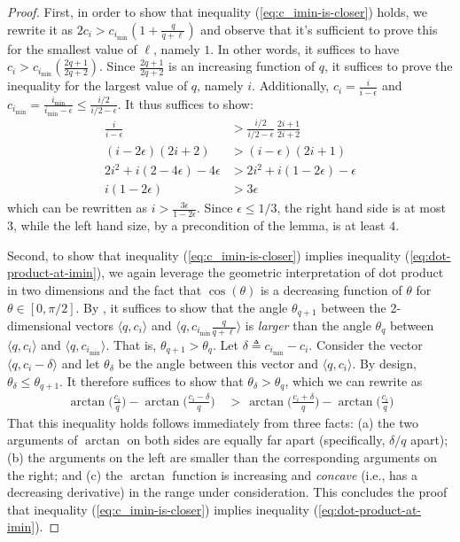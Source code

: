 \begin{proof}
    First, in order to show that inequality (\ref{eq:c_imin-is-closer}) holds, we rewrite it as
    $2 c_i > c_{i_{\min}} \left(1 + \frac{q}{q+\ell}\right)$ and observe that it's sufficient to prove this for the smallest value of $\ell$, namely $1$. In other words, it suffices to have $c_i > c_{i_{\min}} \left( \frac{2q + 1}{2q + 2} \right)$. Since $\frac{2q + 1}{2q + 2}$ is an increasing function of $q$, it suffices to prove the inequality for the largest value of $q$, namely $i$. Additionally, $c_i = \frac{i}{i-\epsilon}$ and $c_{i_{\min}} = \frac{i_{\min}}{i_{\min}-\epsilon} \leq \frac{i/2}{i/2-\epsilon}$. It thus suffices to show:
    \begin{align*}
        \frac{i}{i-\epsilon} & > \frac{i/2}{i/2-\epsilon} \, \frac{2i+1}{2i+2} \\
        (i - 2\epsilon) (2i + 2) & > (i - \epsilon) (2i + 1) \\
        2i^2 + i (2 - 4\epsilon) - 4\epsilon & > 2i^2 + i (1 - 2\epsilon) - \epsilon \\
        i (1 - 2\epsilon) & > 3\epsilon
    \end{align*}
    which can be rewritten as $i > \frac{3\epsilon}{1 - 2\epsilon}$. Since $\epsilon \leq 1/3$, the right hand side is at most 3, while the left hand size, by a precondition of the lemma, is at least $4$.

    Second, to show that inequality (\ref{eq:c_imin-is-closer}) implies inequality (\ref{eq:dot-product-at-imin}), we again leverage the geometric interpretation of dot product in two dimensions and the fact that $\cos(\theta)$ is a decreasing function of $\theta$ for $\theta \in [0, \pi/2]$. By , it suffices to show that the angle $\theta_{q+1}$ between the 2-dimensional vectors $\langle q, c_i \rangle$ and $\langle q, c_{i_{\min}} \frac{q}{q+\ell} \rangle$ is \emph{larger} than the angle $\theta_q$ between $\langle q, c_i \rangle$ and $\langle q, c_{i_{\min}} \rangle$. That is, $\theta_{q+1} > \theta_q$. Let $\delta \triangleq c_{i_{\min}} - c_i$. Consider the vector $\langle q, c_i - \delta \rangle$ and let $\theta_\delta$ be the angle between this vector and $\langle q, c_i \rangle$. By design, $\theta_\delta \leq \theta_{q+1}$. It therefore suffices to show that $\theta_\delta > \theta_q$, which we can rewrite as
    \begin{align*}
        \arctan\big(\frac{c_i}{q}\big) - \arctan\big(\frac{c_i - \delta}{q}\big)
          & \, > \, \arctan\big(\frac{c_i + \delta}{q}\big) - \arctan\big(\frac{c_i}{q}\big)
    \end{align*}
    That this inequality holds follows immediately from three facts: (a) the two arguments of $\arctan$ on both sides are equally far apart (specifically, $\delta/q$ apart); (b) the arguments on the left are smaller than the corresponding arguments on the right; and (c) the $\arctan$ function is increasing and \emph{concave} (i.e., has a decreasing derivative) in the range under consideration. This concludes the proof that inequality (\ref{eq:c_imin-is-closer}) implies inequality (\ref{eq:dot-product-at-imin}).
    

\end{proof}
